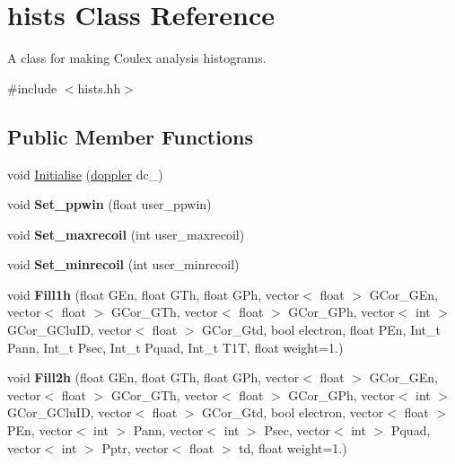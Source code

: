 \hypertarget{classhists}{\section{hists Class Reference}
\label{classhists}
}


A class for making Coulex analysis histograms.  




{\ttfamily \#include $<$hists.\-hh$>$}

\subsection*{Public Member Functions}
\begin{DoxyCompactItemize}
\item 
void \hyperlink{classhists_affb3dcaefba3b63d20bbe438030e2f81}{Initialise} (\hyperlink{classdoppler}{doppler} dc\-\_\-)
\item 
\hypertarget{classhists_a98cf7d91940c6d77105d07b0783399ee}{void {\bfseries Set\-\_\-ppwin} (float user\-\_\-ppwin)}\label{classhists_a98cf7d91940c6d77105d07b0783399ee}

\item 
\hypertarget{classhists_ae986e831e139c9e7e5a4e327e864484d}{void {\bfseries Set\-\_\-maxrecoil} (int user\-\_\-maxrecoil)}\label{classhists_ae986e831e139c9e7e5a4e327e864484d}

\item 
\hypertarget{classhists_acfb845682216224712565e7b8a1c3ce2}{void {\bfseries Set\-\_\-minrecoil} (int user\-\_\-minrecoil)}\label{classhists_acfb845682216224712565e7b8a1c3ce2}

\item 
\hypertarget{classhists_a0cc07e066791f9e8925fbbcfdc00d723}{void {\bfseries Fill1h} (float G\-En, float G\-Th, float G\-Ph, vector$<$ float $>$ G\-Cor\-\_\-\-G\-En, vector$<$ float $>$ G\-Cor\-\_\-\-G\-Th, vector$<$ float $>$ G\-Cor\-\_\-\-G\-Ph, vector$<$ int $>$ G\-Cor\-\_\-\-G\-Clu\-I\-D, vector$<$ float $>$ G\-Cor\-\_\-\-Gtd, bool electron, float P\-En, Int\-\_\-t Pann, Int\-\_\-t Psec, Int\-\_\-t Pquad, Int\-\_\-t T1\-T, float weight=1.)}\label{classhists_a0cc07e066791f9e8925fbbcfdc00d723}

\item 
\hypertarget{classhists_a84e3dd3dc98652844bbfea63652eb280}{void {\bfseries Fill2h} (float G\-En, float G\-Th, float G\-Ph, vector$<$ float $>$ G\-Cor\-\_\-\-G\-En, vector$<$ float $>$ G\-Cor\-\_\-\-G\-Th, vector$<$ float $>$ G\-Cor\-\_\-\-G\-Ph, vector$<$ int $>$ G\-Cor\-\_\-\-G\-Clu\-I\-D, vector$<$ float $>$ G\-Cor\-\_\-\-Gtd, bool electron, vector$<$ float $>$ P\-En, vector$<$ int $>$ Pann, vector$<$ int $>$ Psec, vector$<$ int $>$ Pquad, vector$<$ int $>$ Pptr, vector$<$ float $>$ td, float weight=1.)}\label{classhists_a84e3dd3dc98652844bbfea63652eb280}


\end{DoxyCompactItemize}

